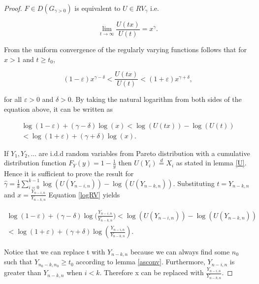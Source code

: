 \documentclass[english,12pt,a4paper,pdftex,sci,utf8]{aaltothesis} %
\begin{document}
\begin{proof}

$F \in D(G_{\gamma>0})$ is equivalent to $U \in RV_{\gamma}$ i.e.

\begin{equation*}
\lim_{t\to\infty} \frac{U(tx)}{U(t)} = x^{\gamma}.
\end{equation*}

From the uniform convergence of the regularly varying functions follows that for $x>1$ and $t \geq t_0$,

\begin{equation*}
(1-\varepsilon) x^{\gamma - \delta} < \frac{U(tx)}{U(t)} < (1+\varepsilon) x^{\gamma + \delta},
\end{equation*}

for all $\varepsilon>0$ and $\delta>0$. By taking the natural logarithm from both sides of the equation above, it can be written as

\begin{equation}
\begin{split}
\log(1 - \varepsilon) + (\gamma - \delta) \log(x) < \log(U(tx)) - \log(U(t)) \\
< \log(1 + \varepsilon) + (\gamma + \delta) \log(x).
\end{split}
\label{logRV}
\end{equation}

If $Y_1, Y_2,...$ are i.d.d random variables from Pareto distribution with a cumulative distribution function $F_Y(y) = 1 - \frac{1}{y}$ then $U(Y_i)  \overset{d}{=} X_i$  as stated in lemma \ref{U}. Hence it is sufficient to prove the result for $ \hat{\gamma} =  \frac{1}{k} \sum_{i=0}^{k-1} \log(U(Y_{n-i,n})) - \log(U(Y_{n-k,n})) $. Substituting $t = Y_{n-k,n}$ and $x =\frac{Y_{n-i,n}}{Y_{n-k,n}}$ Equation \eqref{logRV} yields


\begin{equation}
\begin{split}
\log(1 - \varepsilon) + (\gamma - \delta) \log\Big(\frac{Y_{n-i,n}}{Y_{n-k,n}}\Big) < \log(U(Y_{n-i,n})) - \log(U(Y_{n-k,n})) \\
< \log(1 + \varepsilon) + (\gamma + \delta) \log(\frac{Y_{n-i,n}}{Y_{n-k,n}}).
\end{split}
\label{log}
\end{equation}

Notice that we can replace t with $Y_{n-k,n}$ because we can always find some $n_0$ such that $Y_{n_0-k,n_0} \geq t_0$ according to lemma \ref{asconv}. Furthermore, $Y_{n-i,n}$ is greater than $Y_{n-k,n}$ when $i<k$. Therefore x can be replaced with $\frac{Y_{n-i,n}}{Y_{n-k,n}}$.


\end{proof}
\end{document}
